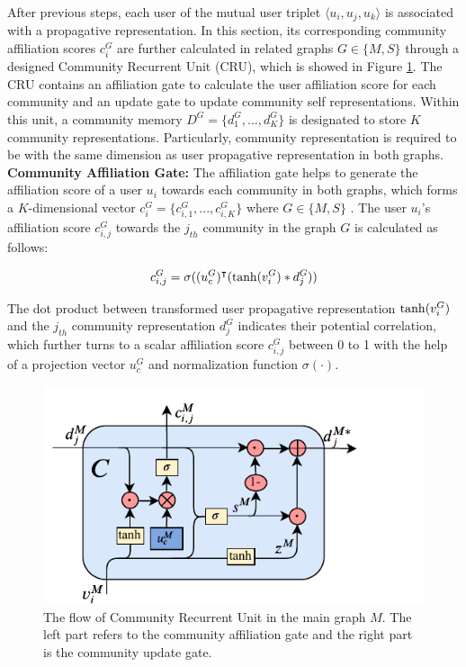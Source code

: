 After previous steps, each user of the mutual user triplet $\langle u_{i},u_{j},u_{k}\rangle$ is associated with a propagative representation. In this section, its corresponding community affiliation scores $c_{i}^{G}$ are further calculated in related graphs $G \in\{M,S\}$ through a designed Community Recurrent Unit (CRU), which is showed in Figure \ref{fig:cru}. The CRU contains an affiliation gate to calculate the user affiliation score for each community and an update gate to update community self representations. Within this unit, a community memory $D^{G} = \{d_1^G,...,d_K^G\}$ is designated to store $K$ community representations. Particularly, community representation is required to be with the same dimension as user propagative representation in both graphs.
\textbf{Community Affiliation Gate:} The affiliation gate helps to generate the affiliation score of a user $u_i$ towards each community in both graphs, which forms a $K$-dimensional vector $c_{i}^{G} = \{c_{i,1}^{G},...,c_{i,K}^{G}\}$ where $G \in \{M, S\}$ . The user $u_i$'s affiliation score $c_{i,j}^G$ towards the $j_{th}$ community in the graph $G$ is calculated as follows:

\begin{equation}\label{eq:dg}
c_{i,j}^G = {\rm  \sigma}((u_{c}^{G})^{\intercal}({\rm  tanh}(v_{i}^{G})*d_j^G))
\end{equation}

The dot product between transformed user propagative representation ${\rm  tanh}(v_{i}^{G})$ and the $j_{th}$ community representation $ d_j^G$ indicates their potential correlation, which further  turns to a scalar affiliation score $c_{i,j}^G$ between 0 to 1 with the help of a projection vector $u_{c}^{G}$ and normalization function $\sigma(\cdot)$.

\begin{figure}  
	\centering
	\includegraphics[width=1.2\columnwidth]{img/chapter4/cru.pdf}
	\caption{The flow of Community Recurrent Unit in the main graph $M$. The left part refers to the community affiliation gate and the right part is the community update gate.}
	\label{fig:cru}
\end{figure}

